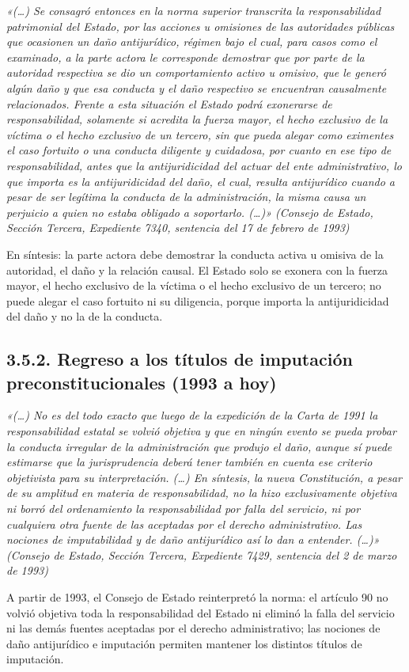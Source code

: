 \begin{cita}
\textit{«(…) Se consagró entonces en la norma superior transcrita la responsabilidad patrimonial del Estado, por las acciones u omisiones de las autoridades públicas que ocasionen un daño antijurídico, régimen bajo el cual, para casos como el examinado, a la parte actora le corresponde demostrar que por parte de la autoridad respectiva se dio un comportamiento activo u omisivo, que le generó algún daño y que esa conducta y el daño respectivo se encuentran causalmente relacionados. Frente a esta situación el Estado podrá exonerarse de responsabilidad, solamente si acredita la fuerza mayor, el hecho exclusivo de la víctima o el hecho exclusivo de un tercero, sin que pueda alegar como eximentes el caso fortuito o una conducta diligente y cuidadosa, por cuanto en ese tipo de responsabilidad, antes que la antijuridicidad del actuar del ente administrativo, lo que importa es la antijuridicidad del daño, el cual, resulta antijurídico cuando a pesar de ser legítima la conducta de la administración, la misma causa un perjuicio a quien no estaba obligado a soportarlo. (…)» (Consejo de Estado, Sección Tercera, Expediente 7340, sentencia del 17 de febrero de 1993)}
\end{cita}
En síntesis: la parte actora debe demostrar la conducta activa u omisiva de la autoridad, el daño y la relación causal. El Estado solo se exonera con la fuerza mayor, el hecho exclusivo de la víctima o el hecho exclusivo de un tercero; no puede alegar el caso fortuito ni su diligencia, porque importa la antijuridicidad del daño y no la de la conducta.

\subsection{3.5.2. Regreso a los títulos de imputación preconstitucionales (1993 a hoy)}
\begin{cita}
\textit{«(…) No es del todo exacto que luego de la expedición de la Carta de 1991 la responsabilidad estatal se volvió objetiva y que en ningún evento se pueda probar la conducta irregular de la administración que produjo el daño, aunque sí puede estimarse que la jurisprudencia deberá tener también en cuenta ese criterio objetivista para su interpretación. (…) En síntesis, la nueva Constitución, a pesar de su amplitud en materia de responsabilidad, no la hizo exclusivamente objetiva ni borró del ordenamiento la responsabilidad por falla del servicio, ni por cualquiera otra fuente de las aceptadas por el derecho administrativo. Las nociones de imputabilidad y de daño antijurídico así lo dan a entender. (…)» (Consejo de Estado, Sección Tercera, Expediente 7429, sentencia del 2 de marzo de 1993)}
\end{cita}
A partir de 1993, el Consejo de Estado reinterpretó la norma: el artículo 90 no volvió objetiva toda la responsabilidad del Estado ni eliminó la falla del servicio ni las demás fuentes aceptadas por el derecho administrativo; las nociones de daño antijurídico e imputación permiten mantener los distintos títulos de imputación.


